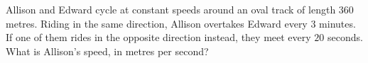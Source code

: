 Allison and Edward cycle at constant speeds around an oval track of length $360$ metres. Riding in the same direction, Allison overtakes Edward every $3$ minutes. If one of them rides in the opposite direction instead, they meet every $20$ seconds. What is Allison's speed, in metres per second?
